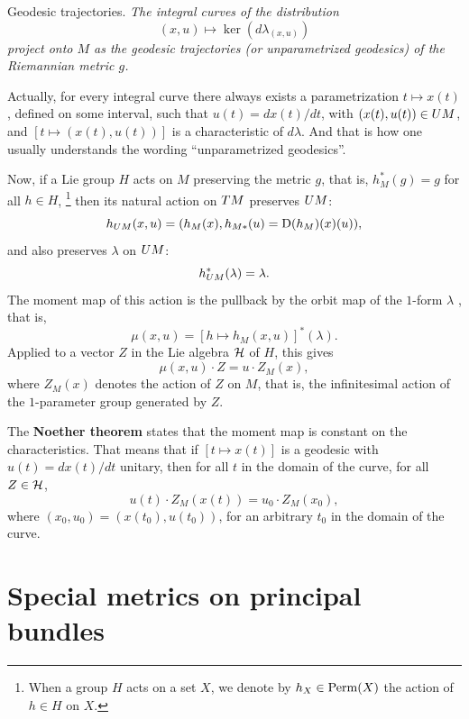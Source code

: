 \begin{Article}{Geodesic trajectories.}{\itshape
  The integral curves of the distribution
  $$%
    (x,u) \mapsto \ker(d\lambda_{(x,u)})
    $$%
  project onto $M$ as the geodesic trajectories (or unparametrized geo\-de\-sics) of the Riemannian metric $g$.
  }
\end{Article}

Actually,
for every integral curve there always exists a parametrization $t \mapsto x(t)$,
defined on some interval,
such that $u(t) = dx(t)/dt$,
with $(x(t),u(t)) \in U{M}$,
and $[t \mapsto (x(t),u(t))]$ is a characteristic of $d\lambda$.
And that is how one usually understands the wording ``unparametrized geodesics''.

Now,
if a Lie group $H$ acts on $M$ preserving the metric $g$,
that is,
$h_M^*(g) = g$ for all $h \in H$,%
\footnote{When a group $H$ acts on a set $X$, we denote by $h_X \in \mathrm{Perm}(X)$ the action of $h \in H$ on $X$.}
then its natural action on $T M$ preserves $U{M}$:
$$%
  h_{\UnitBundle{M}}(x,u) = (h_M(x), h_{M*}(u) = \Der(h_M)(x)(u)),
  $$%
and also preserves $\lambda$ on $U{M}$:
$$%
  h_{\UnitBundle{M}}^*(\lambda) = \lambda.
  $$%
The moment map of this action is the pullback by the orbit map of the $1$-form $\lambda$ \cite{PIZ10},
that is,
$$%
  \mu(x,u) = [h \mapsto h_M(x,u)]^*(\lambda).
  $$%
Applied to a vector $Z$ in the Lie algebra $\mathcal{H}$ of $H$,
this gives
$$%
  \mu(x,u) \cdot Z = u \cdot Z_M(x),
  $$%
where $Z_M(x)$ denotes the action of $Z$ on $M$,
that is,
the infinitesimal action of the $1$-parameter group generated by $Z$.

The \textbf{Noether theorem} states that the moment map is constant on the characteristics.
That means that if $[t \mapsto x(t)]$ is a geodesic with $u(t) = dx(t)/dt$ unitary,
then for all $t$ in the domain of the curve,
for all $Z \in \mathcal{H}$,
$$%
  u(t) \cdot Z_M(x(t)) = u_0 \cdot Z_M(x_0),
  $$%
where $(x_0,u_0) = (x(t_0),u(t_0))$,
for an arbitrary $t_0$ in the domain of the curve.


\def \UlOrthogonal {\underline{ortho}g\underline{onal}}

\section{Special metrics on principal bundles}

